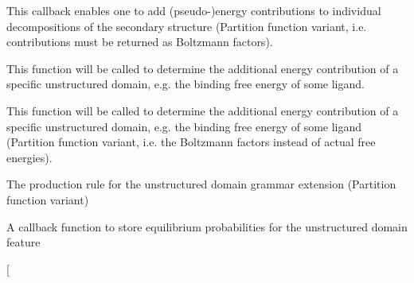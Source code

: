 \begin{DoxyRefList}
\item[\label{callbacks__callbacks000003}%
\Hypertarget{callbacks__callbacks000003}%
Global \hyperlink{group__soft__constraints_ga4099978d410513edeeff8f3db13144c5}{vrna\+\_\+callback\+\_\+sc\+\_\+exp\+\_\+energy} (int i, int j, int k, int l, unsigned char d, void $\ast$data)]This callback enables one to add (pseudo-\/)energy contributions to individual decompositions of the secondary structure (Partition function variant, i.\+e. contributions must be returned as Boltzmann factors).  
\item[\label{callbacks__callbacks000010}%
\Hypertarget{callbacks__callbacks000010}%
Global \hyperlink{group__domains__up_ga75825c57d0bfde4ae4f95c044260c5c3}{vrna\+\_\+callback\+\_\+ud\+\_\+energy} (vrna\+\_\+fold\+\_\+compound\+\_\+t $\ast$vc, int i, int j, unsigned int loop\+\_\+type, void $\ast$data)]This function will be called to determine the additional energy contribution of a specific unstructured domain, e.\+g. the binding free energy of some ligand.  
\item[\label{callbacks__callbacks000011}%
\Hypertarget{callbacks__callbacks000011}%
Global \hyperlink{group__domains__up_ga861706f257ba993753464b823e65b86e}{vrna\+\_\+callback\+\_\+ud\+\_\+exp\+\_\+energy} (vrna\+\_\+fold\+\_\+compound\+\_\+t $\ast$vc, int i, int j, unsigned int loop\+\_\+type, void $\ast$data)]This function will be called to determine the additional energy contribution of a specific unstructured domain, e.\+g. the binding free energy of some ligand (Partition function variant, i.\+e. the Boltzmann factors instead of actual free energies).  
\item[\label{callbacks__callbacks000013}%
\Hypertarget{callbacks__callbacks000013}%
Global \hyperlink{group__domains__up_ga33d78327dcd04c1ca5ab2887edc18c7b}{vrna\+\_\+callback\+\_\+ud\+\_\+exp\+\_\+production} (vrna\+\_\+fold\+\_\+compound\+\_\+t $\ast$vc, void $\ast$data)]The production rule for the unstructured domain grammar extension (Partition function variant)  
\item[\label{callbacks__callbacks000014}%
\Hypertarget{callbacks__callbacks000014}%
Global \hyperlink{group__domains__up_gab10498abc84fcaf336aca8f8d7d42eb2}{vrna\+\_\+callback\+\_\+ud\+\_\+probs\+\_\+add} (vrna\+\_\+fold\+\_\+compound\+\_\+t $\ast$vc, int i, int j, unsigned int loop\+\_\+type, F\+L\+T\+\_\+\+O\+R\+\_\+\+D\+BL exp\+\_\+energy, void $\ast$data)]A callback function to store equilibrium probabilities for the unstructured domain feature  
\item[\label{callbacks__callbacks000015}%

\end{DoxyRefList}
